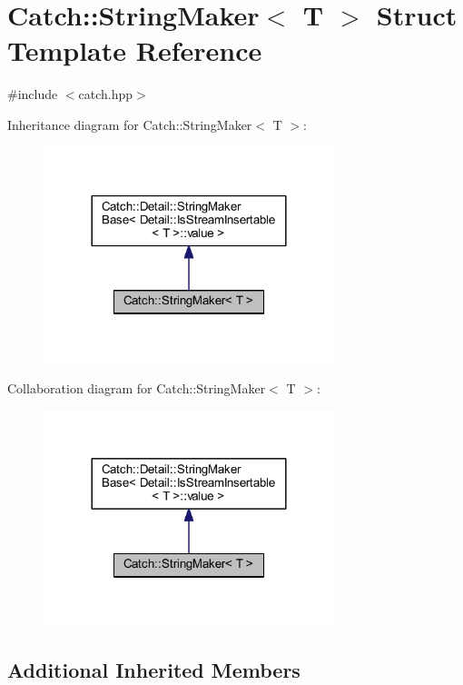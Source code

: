 \hypertarget{struct_catch_1_1_string_maker}{}\section{Catch\+:\+:String\+Maker$<$ T $>$ Struct Template Reference}
\label{struct_catch_1_1_string_maker}


{\ttfamily \#include $<$catch.\+hpp$>$}



Inheritance diagram for Catch\+:\+:String\+Maker$<$ T $>$\+:\nopagebreak
\begin{figure}[H]
\begin{center}
\leavevmode
\includegraphics[width=240pt]{struct_catch_1_1_string_maker__inherit__graph}
\end{center}
\end{figure}


Collaboration diagram for Catch\+:\+:String\+Maker$<$ T $>$\+:\nopagebreak
\begin{figure}[H]
\begin{center}
\leavevmode
\includegraphics[width=240pt]{struct_catch_1_1_string_maker__coll__graph}
\end{center}
\end{figure}
\subsection*{Additional Inherited Members}


